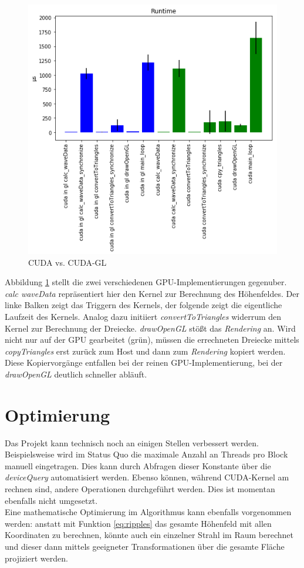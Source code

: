 \documentclass[conference]{IEEEtran}
\begin{document}
\begin{figure}[H]
\centerline{\includegraphics[scale=0.55]{img/cuda_vs_cudagl_32threads.png}}
\label{fig:cuda_vs_cudagl_32threads}
\caption{CUDA vs. CUDA-GL}
\end{figure}
Abbildung \ref{fig:cuda_vs_cudagl_32threads} stellt die zwei verschiedenen GPU-Implementierungen gegenuber. \textit{calc waveData} repr\"asentiert hier den Kernel zur Berechnung des H\"ohenfeldes. Der linke Balken zeigt das Triggern des Kernels, der folgende zeigt die eigentliche Laufzeit des Kernels. Analog dazu initiiert \textit{convertToTriangles}  widerrum den Kernel zur Berechnung der Dreiecke. \textit{drawOpenGL} st\"o{\ss}t das \textit{Rendering} an. Wird nicht nur auf der GPU gearbeitet (gr\"un), m\"ussen die errechneten Dreiecke mittels \textit{copyTriangles} erst zur\"uck zum Host und dann zum \textit{Rendering} kopiert werden. Diese Kopiervorg\"ange entfallen bei der reinen GPU-Implementierung, bei der \textit{drawOpenGL} deutlich schneller abl\"auft.

\section{Optimierung}\label{sec:optim}
Das Projekt  kann technisch noch an einigen Stellen verbessert werden. Beispielsweise wird im Status Quo die maximale Anzahl an Threads pro Block manuell eingetragen. Dies kann durch Abfragen dieser Konstante \"uber die \textit{deviceQuery} automatisiert werden. Ebenso k\"onnen, w\"ahrend CUDA-Kernel am rechnen sind, andere Operationen durchgef\"uhrt werden. Dies ist momentan ebenfalls nicht umgesetzt.\\
Eine mathematische Optimierung im Algorithmus kann ebenfalls vorgenommen werden: anstatt mit Funktion \ref{eq:ripples} das gesamte H\"ohenfeld mit allen Koordinaten zu berechnen, k\"onnte auch ein einzelner Strahl im Raum berechnet und dieser dann mittels geeigneter Transformationen \"uber die gesamte Fl\"ache projiziert werden.
\end{document}
